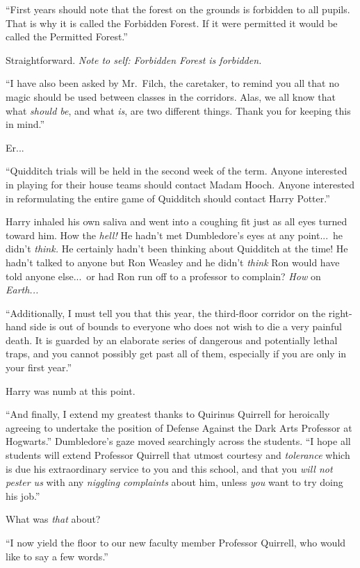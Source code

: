 “First years should note that the forest on the grounds is forbidden to all pupils. That is why it is called the Forbidden Forest. If it were permitted it would be called the Permitted Forest.”

Straightforward. \emph{Note to self: Forbidden Forest is forbidden.}

“I have also been asked by Mr.~Filch, the caretaker, to remind you all that no magic should be used between classes in the corridors. Alas, we all know that what \emph{should be}, and what \emph{is}, are two different things. Thank you for keeping this in mind.”

Er...

“Quidditch trials will be held in the second week of the term. Anyone interested in playing for their house teams should contact Madam Hooch. Anyone interested in reformulating the entire game of Quidditch should contact Harry Potter.”

Harry inhaled his own saliva and went into a coughing fit just as all eyes turned toward him. How the \emph{hell!} He hadn’t met Dumbledore’s eyes at any point...\ he didn’t \emph{think.} He certainly hadn’t been thinking about Quidditch at the time! He hadn’t talked to anyone but Ron Weasley and he didn’t \emph{think} Ron would have told anyone else...\ or had Ron run off to a professor to complain? \emph{How} on \emph{Earth...}

“Additionally, I must tell you that this year, the third-floor corridor on the right-hand side is out of bounds to everyone who does not wish to die a very painful death. It is guarded by an elaborate series of dangerous and potentially lethal traps, and you cannot possibly get past all of them, especially if you are only in your first year.”

Harry was numb at this point.

“And finally, I extend my greatest thanks to Quirinus Quirrell for heroically agreeing to undertake the position of Defense Against the Dark Arts Professor at Hogwarts.” Dumbledore’s gaze moved searchingly across the students. “I hope all students will extend Professor Quirrell that utmost courtesy and \emph{tolerance} which is due his extraordinary service to you and this school, and that you \emph{will not pester us} with any \emph{niggling complaints} about him, unless \emph{you} want to try doing his job.”

What was \emph{that} about?

“I now yield the floor to our new faculty member Professor Quirrell, who would like to say a few words.”

